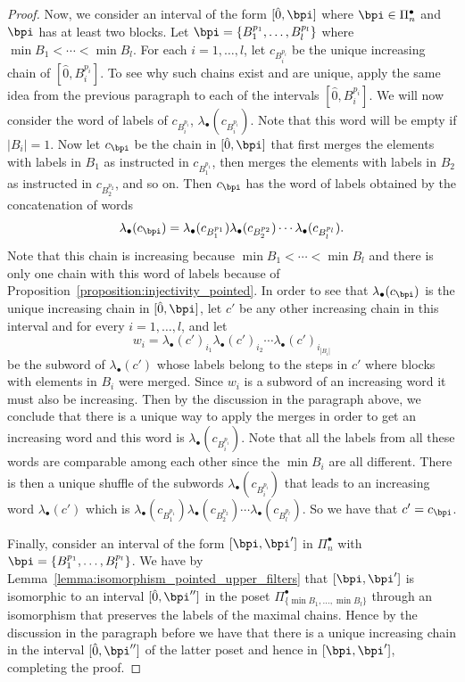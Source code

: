\begin{proof}
Now, we consider an interval of the form $[\hat{0},\bpi]$ where $\bpi \in \Pi_n^{\bullet}$ and $\bpi$ has at least two blocks. Let $\bpi=\{B_1^{p_1},\dots,B_l^{p_l}\}$ where $\min B_1 <\cdots <\min B_l$. For each $i=1,\dots,l$,  let  $c_{B_i^{p_i}}$ be the unique increasing chain of $[\hat{0},B_i^{p_i}]$. To see why such  chains exist and are unique, apply the same idea from the previous paragraph to each of the intervals  $[\hat{0},B_i^{p_i}]$.  We will now consider the word of labels of  $c_{B_i^{p_i}}$,  $\lambda_{\bullet}(c_{B_i^{p_i}})$.  Note that this word will be empty if $|B_i|=1$. Now let $c_{\bpi}$ be the chain in $[\hat{0},\bpi]$ that first merges the elements with labels in $B_1$ as instructed in $c_{B_1^{p_1}}$, then merges the elements with labels in $B_2$ as instructed in $c_{B_2^{p_2}}$, and so on.  Then  $c_{\bpi}$ has the  word of labels obtained by the concatenation of words
$$\lambda_{\bullet}(c_{\bpi})=\lambda_{\bullet}(c_{B_1^{p_1}})\lambda_{\bullet}(c_{B_2^{p_2}})\cdots\lambda_{\bullet}(c_{B_l^{p_l}}).
$$
Note that this chain is increasing because $\min B_1 <\cdots <\min B_l$ and there is only one chain with this word of labels because of 
Proposition~\ref{proposition:injectivity_pointed}.  In order to see that $\lambda_{\bullet}(c_{\bpi})$ is the unique increasing chain in $[\hat{0},\bpi]$, let $c'$ be any other increasing chain in this interval and for every $i=1,\dots,l$, and let 
$$w_i=\lambda_{\bullet}(c')_{i_1}\lambda_{\bullet}(c')_{i_2}\cdots \lambda_{\bullet}(c')_{i_{|B_i|}}$$ be the subword 
of $\lambda_{\bullet}(c')$ whose labels belong to the steps in $c'$
where blocks with elements in $B_i$ were merged. Since $w_i$ is a subword of an increasing word it must also be increasing. Then by the discussion in the paragraph above, we conclude that there is a unique way to apply the merges in order to get an increasing word and this word is $\lambda_{\bullet}(c_{B_i^{p_i}})$. Note that all the labels from all these words are comparable among each other since the $\min B_i$ are all  different. There is then a unique shuffle of the subwords  $\lambda_{\bullet}(c_{B_i^{p_i}})$ that leads to an increasing word  $\lambda_{\bullet}(c')$ which is $\lambda_{\bullet}(c_{B_1^{p_1}})\lambda_{\bullet}(c_{B_2^{p_2}})\cdots\lambda_{\bullet}(c_{B_l^{p_l}})$. So we have that $c'=c_{\bpi}$. 

Finally, consider an interval of the form $[\bpi, \bpi']$ in $\Pi_n^{\bullet}$ with $\bpi=\{B_1^{p_1},\dots,B_l^{p_l}\}$. We have by Lemma~\ref{lemma:isomorphism_pointed_upper_filters} that $[\bpi, \bpi']$ is isomorphic to an interval $[\hat{0},\bpi'']$ in the poset $\Pi_{\{\min B_1, \dots, \min B_l\}}^{\bullet}$ through an isomorphism that preserves the labels of the maximal chains. Hence by the discussion in the paragraph before we have that there is a unique increasing chain in the interval  $[\hat{0},\bpi'']$ of the latter poset and hence in $[\bpi, \bpi']$, completing the proof.
\end{proof}


